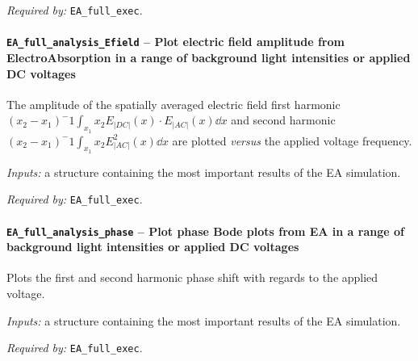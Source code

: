 \textit{Required by:} \texttt{EA\_full\_exec}.



		\paragraph{\texttt{EA\_full\_analysis\_Efield} -- Plot electric field amplitude from ElectroAbsorption in a range of background light intensities or applied DC voltages}
		The amplitude of the spatially averaged electric field first harmonic $(x_2-x_1)^-1 \int_{x_1}{x_2}E_|DC|(x) \cdot E_|AC|(x) \dd x$ and second harmonic $(x_2-x_1)^-1 \int_{x_1}{x_2} E_|AC|^2(x) \dd x$ are plotted \textsl{versus} the applied voltage frequency.
		
				\textit{Inputs:} a structure containing the most important results of the EA simulation.
		
		
		
		\textit{Required by:} \texttt{EA\_full\_exec}.
		
		
		\paragraph{\texttt{EA\_full\_analysis\_phase} -- Plot phase Bode plots from EA in a range of background light intensities or applied DC voltages}
		Plots the first and second harmonic phase shift with regards to the applied voltage.
		
		\textit{Inputs:} a structure containing the most important results of the EA simulation.
		
		
		
		\textit{Required by:} \texttt{EA\_full\_exec}.
		





